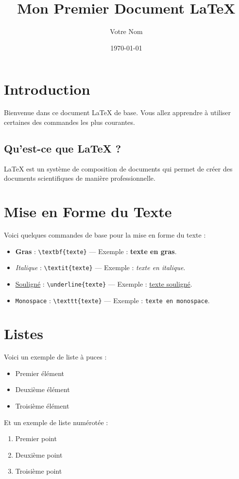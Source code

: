 \documentclass[12pt]{article}
\title{Mon Premier Document LaTeX}
\author{Votre Nom}
\date{\today}
\begin{document}
\maketitle %

\section{Introduction}
Bienvenue dans ce document LaTeX de base. Vous allez apprendre à utiliser certaines des commandes les plus courantes.

\subsection{Qu'est-ce que LaTeX ?}
LaTeX est un système de composition de documents qui permet de créer des documents scientifiques de manière professionnelle. 

\section{Mise en Forme du Texte}
Voici quelques commandes de base pour la mise en forme du texte :
\begin{itemize}
    \item \textbf{Gras} : \texttt{\textbackslash textbf\{texte\}} — Exemple : \textbf{texte en gras}.
    \item \textit{Italique} : \texttt{\textbackslash textit\{texte\}} — Exemple : \textit{texte en italique}.
    \item \underline{Souligné} : \texttt{\textbackslash underline\{texte\}} — Exemple : \underline{texte souligné}.
    \item \texttt{Monospace} : \texttt{\textbackslash texttt\{texte\}} — Exemple : \texttt{texte en monospace}.
\end{itemize}
\newpage
\section{Listes}
Voici un exemple de liste à puces :
\begin{itemize}
    \item Premier élément
    \item Deuxième élément
    \item Troisième élément
\end{itemize}

Et un exemple de liste numérotée :
\begin{enumerate}
    \item Premier point
    \item Deuxième point
    \item Troisième point
\end{enumerate}
\end{document}

